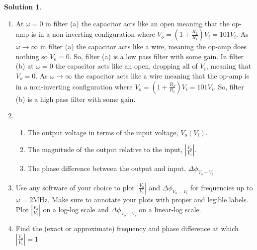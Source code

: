 \documentclass[10pt]{article}
\theoremstyle{definition}
\newtheorem{soln}{Solution}
\begin{document}
\begin{soln}~
  \begin{enumerate}[label=(\alph*)]
    \item At $\omega=0$ in filter (a) the capacitor acts like an open meaning that the op-amp is in a non-inverting configuration where $V_o=\left(1+\frac{R_2}{R_1}\right)V_i=101V_i$.
    As $\omega\to\infty$ in filter (a) the capacitor acts like a wire, meaning the op-amp does nothing so $V_o=0$. So, filter (a) is a low pass filter with some gain. 
    In filter (b) at $\omega=0$ the capacitor acts like an open, dropping all of $V_i$, meaning that $V_o=0$. As $\omega\to\infty$ the capacitor acts like a wire meaning that
    the op-amp is in a non-inverting configuration where $V_o=\left(1+\frac{R_2}{R_1}\right)V_i=101V_i$. So, filter (b) is a high pass filter with some gain.
    \item   \begin{enumerate}[label=\roman*.]
            \item The output voltage in terms of the input voltage, $V_o(V_i)$.
            \item The magnitude of the output relative to the input, $\left|\frac{V_o}{V_i}\right|$.
            \item The phase difference between the output and input, $\Delta\phi_{V_o-V_i}$
          \end{enumerate}
    \item Use any software of your choice to plot $\left|\frac{V_o}{V_i}\right|$ and $\Delta\phi_{V_o-V_i}$ for frequencies up to $\omega=2\unit{\mega\hertz}$. 
    Make sure to annotate your plots with proper and legible labels. Plot $\left|\frac{V_o}{V_i}\right|$ on a log-log scale and $\Delta\phi_{V_o-V_i}$ on a linear-log scale.
    \item Find the (exact or approximate) frequency and phase difference at which $\left|\frac{V_o}{V_i}\right|=1$
  \end{enumerate}
\end{soln}
\end{document}
